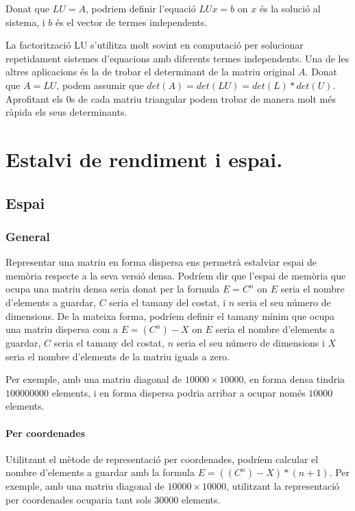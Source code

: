 \documentclass[11pt,a4paper,twoside]{report}
\begin{document}
Donat que $LU = A$, podriem definir l'equació $LUx = b$ on $x$ és la solució al sistema, i $b$ és el vector de termes independents.

La factorització LU s'utilitza molt sovint en computació per solucionar repetidament sistemes d'equacions amb diferents termes independents.
Una de les altres aplicacions és la de trobar el determinant de la matriu original $A$. Donat que $A = LU$, podem assumir que $det(A) = det(LU) = det(L) * det(U)$. Aprofitant els 0s de cada matriu triangular podem trobar de manera molt més ràpida els seus determinants.

\chapter{Estalvi de rendiment i espai.}

\section{Espai}

\subsection{General}

Representar una matriu en forma dispersa ens permetrà estalviar espai de memòria respecte a la seva versió densa.
Podríem dir que l'espai de memòria que ocupa una matriu densa seria donat per la formula $E=C^n$ on $E$ seria el nombre d'elements a guardar, $C$ seria el tamany del costat, i $n$ seria el seu número de dimensions.
De la mateixa forma, podríem definir el tamany mínim que ocupa una matriu dispersa com a $E=(C^n)-X$ on $E$ seria el nombre d'elements a guardar, $C$ seria el tamany del costat, $n$ seria el seu número de dimensions i $X$ seria el nombre d'elements de la matriu iguals a zero.


Per exemple, amb una matriu diagonal de $10000 \times 10000$, en forma densa tindria $100000000$ elements, i en forma dispersa podria arribar a ocupar només $10000$ elements.
\subsubsection{Per coordenades}

Utilitzant el mètode de representació per coordenades, podríem calcular el nombre d'elements a guardar amb la formula $E=((C^n)-X)*(n+1)$.
Per exemple, amb una matriu diagonal de $10000 \times 10000$, utilitzant la representació per coordenades ocuparia tant sols $30000$ elements.
\end{document}
